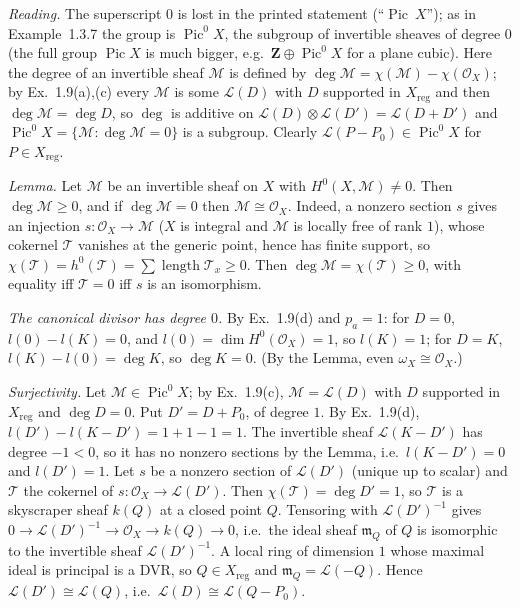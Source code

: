 \documentclass[11pt]{article}
\begin{document}
\pf
\emph{Reading.} The superscript $0$ is lost in the printed statement (``$\operatorname{Pic}\ X$''); as in Example~1.3.7 the group is $\operatorname{Pic}^0X$, the subgroup of invertible sheaves of degree $0$ (the full group $\operatorname{Pic}X$ is much bigger, e.g.\ $\mathbf Z\oplus\operatorname{Pic}^0X$ for a plane cubic). Here the degree of an invertible sheaf $\mathcal M$ is defined by $\deg\mathcal M=\chi(\mathcal M)-\chi(\mathcal O_X)$; by Ex.~1.9(a),(c) every $\mathcal M$ is some $\mathcal L(D)$ with $D$ supported in $X_{\mathrm{reg}}$ and then $\deg\mathcal M=\deg D$, so $\deg$ is additive on $\mathcal L(D)\otimes\mathcal L(D')=\mathcal L(D+D')$ and $\operatorname{Pic}^0X=\{\mathcal M:\deg\mathcal M=0\}$ is a subgroup. Clearly $\mathcal L(P-P_0)\in\operatorname{Pic}^0X$ for $P\in X_{\mathrm{reg}}$.

\emph{Lemma.} Let $\mathcal M$ be an invertible sheaf on $X$ with $H^0(X,\mathcal M)\ne0$. Then $\deg\mathcal M\ge0$, and if $\deg\mathcal M=0$ then $\mathcal M\cong\mathcal O_X$. Indeed, a nonzero section $s$ gives an injection $s:\mathcal O_X\to\mathcal M$ ($X$ is integral and $\mathcal M$ is locally free of rank $1$), whose cokernel $\mathcal T$ vanishes at the generic point, hence has finite support, so $\chi(\mathcal T)=h^0(\mathcal T)=\sum\operatorname{length}\mathcal T_x\ge0$. Then $\deg\mathcal M=\chi(\mathcal T)\ge0$, with equality iff $\mathcal T=0$ iff $s$ is an isomorphism.

\emph{The canonical divisor has degree $0$.} By Ex.~1.9(d) and $p_a=1$: for $D=0$, $l(0)-l(K)=0$, and $l(0)=\dim H^0(\mathcal O_X)=1$, so $l(K)=1$; for $D=K$, $l(K)-l(0)=\deg K$, so $\deg K=0$. (By the Lemma, even $\omega_X\cong\mathcal O_X$.)

\emph{Surjectivity.} Let $\mathcal M\in\operatorname{Pic}^0X$; by Ex.~1.9(c), $\mathcal M=\mathcal L(D)$ with $D$ supported in $X_{\mathrm{reg}}$ and $\deg D=0$. Put $D'=D+P_0$, of degree $1$. By Ex.~1.9(d), $l(D')-l(K-D')=1+1-1=1$. The invertible sheaf $\mathcal L(K-D')$ has degree $-1<0$, so it has no nonzero sections by the Lemma, i.e.\ $l(K-D')=0$ and $l(D')=1$. Let $s$ be a nonzero section of $\mathcal L(D')$ (unique up to scalar) and $\mathcal T$ the cokernel of $s:\mathcal O_X\to\mathcal L(D')$. Then $\chi(\mathcal T)=\deg D'=1$, so $\mathcal T$ is a skyscraper sheaf $k(Q)$ at a closed point $Q$. Tensoring with $\mathcal L(D')^{-1}$ gives $0\to\mathcal L(D')^{-1}\to\mathcal O_X\to k(Q)\to0$, i.e.\ the ideal sheaf $\mathfrak m_Q$ of $Q$ is isomorphic to the invertible sheaf $\mathcal L(D')^{-1}$. A local ring of dimension $1$ whose maximal ideal is principal is a DVR, so $Q\in X_{\mathrm{reg}}$ and $\mathfrak m_Q=\mathcal L(-Q)$. Hence $\mathcal L(D')\cong\mathcal L(Q)$, i.e.\ $\mathcal L(D)\cong\mathcal L(Q-P_0)$.
\end{document}

